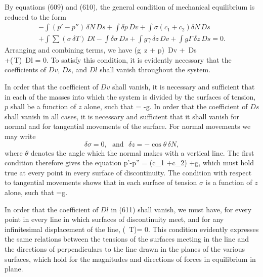 \documentclass[12pt]{memoir}
\newcommand{\dd}{\delta}
\begin{document}
By equations (609) and (610), the general condition of mechanical
equilibrium is reduced to the form
\begin{equation*}\begin{aligned}- \int (p'-p'') \, \dd N \, Ds +\int \dd p \, Dv +\int \sigma (c_1 +c_2) \dd N \, Ds \\
+\int \sum (\sigma\, \dd T)\, Dl- \int \dd \sigma \, Ds+\int g\gamma\, \dd z \,Dv +\int g\Gamma\, \dd z \, Ds = 0.\end{aligned}\end{equation*}
Arranging and combining terms, we have
\eqs \int (g\gamma \, \dd z + \dd p) \,Dv +\int [(p'' -p') \dd N + \sigma (c_1 + c_2) \, \dd N+g \Gamma \, \dd z - \dd \sigma] \, Ds\\
+\int \sum (\sigma \,\dd T)\, Dl = 0. \label{611} \eqe
To satisfy this condition, it is evidently necessary that the coefficients of $Dv$, $Ds$, and $Dl$ shall vanish throughout the system.

In order that the coefficient of $Dv$ shall vanish, it is necessary and sufficient that in each of the masses into which the system is divided by the surfaces of tension, $p$ shall be a function of $z$ alone, such that
\eqs {} =  -g\gamma.  \label{612} \eqe
In order that the coefficient of $Ds$ shall vanish in all cases, it is necessary and sufficient that it shall vanish for normal and for tangential movements of the surface. For normal movements we may write
$$ \dd \sigma = 0, \ \ \ \text{and} \ \ \ \dd z=-\cos \theta \, \dd N,$$
where $\theta$ denotes the angle which the normal makes with a vertical line. The first condition therefore gives the equation
\eqs p'-p'' = \sigma(c_1 +c_2) +g\Gamma  \cos \theta ,   \label{613} \eqe
which must hold true at every point in every surface of discontinuity. The condition with respect to tangential movements shows that in each surface of tension $\sigma$ is a function of $z$ alone, such that
\eqs {}=g\Gamma.         \label{614} \eqe

In order that the coefficient of $Dl$ in (611) shall vanish, we must have, for every point in every line in which surfaces of discontinuity meet, and for any infinitesimal displacement of the line,
\eqs \sum (\sigma \, \dd T)= 0.    \label{615} \eqe
This condition evidently expresses the same relations between the tensions of the surfaces meeting in the line and the directions of perpendiculars to the line drawn in the planes of the various surfaces, which hold for the magnitudes and directions of forces in equilibrium in plane.
\end{document}
